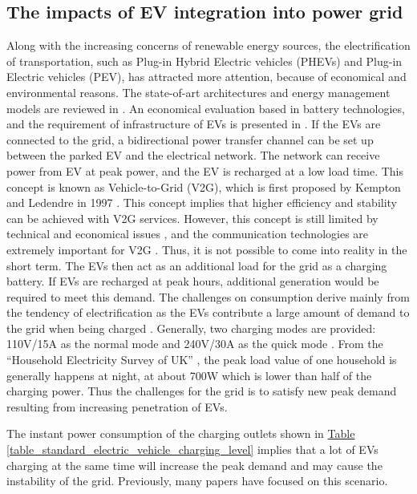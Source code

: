 \documentclass[12pt,a4paper]{report}
\begin{document}
        \subsection{The impacts of EV integration into power grid}
        Along with the increasing concerns of renewable energy sources, the electrification of transportation, such as Plug-in Hybrid Electric vehicles (PHEVs) and Plug-in Electric vehicles (PEV), has attracted more attention, because of economical and environmental reasons.
        The state-of-art architectures and energy management models are reviewed in \cite{paper:evtechreview}. An economical evaluation based in battery technologies, and the requirement of infrastructure of EVs is presented in \cite{paper:offer_howey_contestabile_clague_brandon_2010}.
        If the EVs are connected to the grid, a bidirectional power transfer channel can be set up between the parked EV and the electrical network. The network can receive power from EV at peak power, and the EV is recharged at a low load time. This concept is known as Vehicle-to-Grid (V2G), which is first proposed by Kempton and Ledendre in 1997 \cite{paper:kempton_letendre_1997}.
        This concept implies that higher efficiency and stability can be achieved with V2G services. However, this concept is still limited by technical and economical issues \cite{paper:evlimitation}, and the communication technologies are extremely important for V2G \cite{website:evcommunicationlimits}. Thus, it is not possible to come into reality in the short term.
        The EVs then act as an additional load for the grid as a charging battery. If EVs are recharged at peak hours, additional generation would be required to meet this demand.
        The challenges on consumption derive mainly from the tendency of electrification as the EVs contribute a large amount of demand to the grid when being charged \cite{paper:PieltainFernandez2011}. 
        Generally, two charging modes are provided: 110V/15A as the normal mode and 240V/30A as the quick mode \cite{paper:Shao2010}. 
        From the ``Household Electricity Survey of UK'' \cite{report:household}, the peak load value of one household is generally happens at night, at about 700W which is lower than half of the charging power.
        Thus the challenges for the grid is to satisfy new peak demand resulting from increasing penetration of EVs.

        The instant power consumption of the charging outlets shown in \hyperref[table_standard_electric_vehicle_charging_level]{Table \ref*{table_standard_electric_vehicle_charging_level}} implies that a lot of EVs charging at the same time will increase the peak demand and may cause the instability of the grid. Previously, many papers have focused on this scenario.
\end{document}
